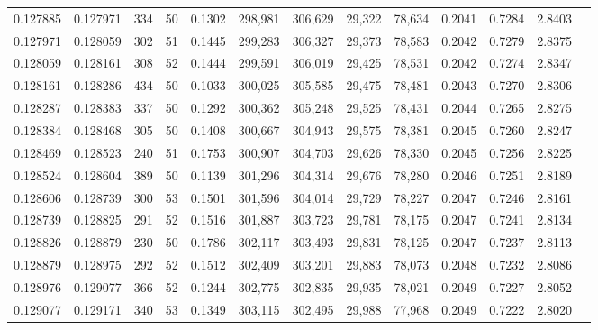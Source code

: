 \begin{tabular}{rrrrrrrrrrrrr}
0.127885 & 0.127971 &   334 &  50 &                                     0.1302 & 298,981 & 306,629 &  29,322 &  78,634 & 0.2041 & 0.7284 & 2.8403 \\
0.127971 & 0.128059 &   302 &  51 &                                     0.1445 & 299,283 & 306,327 &  29,373 &  78,583 & 0.2042 & 0.7279 & 2.8375 \\
0.128059 & 0.128161 &   308 &  52 &                                     0.1444 & 299,591 & 306,019 &  29,425 &  78,531 & 0.2042 & 0.7274 & 2.8347 \\
0.128161 & 0.128286 &   434 &  50 &                                     0.1033 & 300,025 & 305,585 &  29,475 &  78,481 & 0.2043 & 0.7270 & 2.8306 \\
0.128287 & 0.128383 &   337 &  50 &                                     0.1292 & 300,362 & 305,248 &  29,525 &  78,431 & 0.2044 & 0.7265 & 2.8275 \\
0.128384 & 0.128468 &   305 &  50 &                                     0.1408 & 300,667 & 304,943 &  29,575 &  78,381 & 0.2045 & 0.7260 & 2.8247 \\
0.128469 & 0.128523 &   240 &  51 &                                     0.1753 & 300,907 & 304,703 &  29,626 &  78,330 & 0.2045 & 0.7256 & 2.8225 \\
0.128524 & 0.128604 &   389 &  50 &                                     0.1139 & 301,296 & 304,314 &  29,676 &  78,280 & 0.2046 & 0.7251 & 2.8189 \\
0.128606 & 0.128739 &   300 &  53 &                                     0.1501 & 301,596 & 304,014 &  29,729 &  78,227 & 0.2047 & 0.7246 & 2.8161 \\
0.128739 & 0.128825 &   291 &  52 &                                     0.1516 & 301,887 & 303,723 &  29,781 &  78,175 & 0.2047 & 0.7241 & 2.8134 \\
0.128826 & 0.128879 &   230 &  50 &                                     0.1786 & 302,117 & 303,493 &  29,831 &  78,125 & 0.2047 & 0.7237 & 2.8113 \\
0.128879 & 0.128975 &   292 &  52 &                                     0.1512 & 302,409 & 303,201 &  29,883 &  78,073 & 0.2048 & 0.7232 & 2.8086 \\
0.128976 & 0.129077 &   366 &  52 &                                     0.1244 & 302,775 & 302,835 &  29,935 &  78,021 & 0.2049 & 0.7227 & 2.8052 \\
0.129077 & 0.129171 &   340 &  53 &                                     0.1349 & 303,115 & 302,495 &  29,988 &  77,968 & 0.2049 & 0.7222 & 2.8020 \\

\end{tabular}
